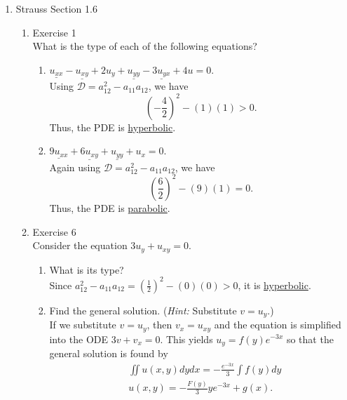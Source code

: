 \documentclass[12pt]{article}%
\begin{document}
\begin{enumerate}
    \pagebreak
    
    \item Strauss Section 1.6 \smallskip
    \begin{enumerate}
        \item Exercise 1 \smallskip \\
        What is the type of each of the following equations?
        \begin{enumerate}
            \item $\underline{u_{xx}} - \underline{u_{xy}} + 2u_y + \underline{u_{yy}} - \underline{3u_{yx}} + 4u = 0$. \smallskip \\
            Using $\mathcal{D} = a_{12}^2 - a_{11}a_{12}$, we have
            $$\left(-\frac{4}{2}\right)^2 - \left(1\right)\left(1\right) > 0.$$
            Thus, the PDE is \underline{hyperbolic}. \\

            
            \item $\underline{9u_{xx}} + \underline{6u_{xy}} + \underline{u_{yy}} + u_x = 0$. \smallskip \\Again using $\mathcal{D} = a_{12}^2 - a_{11}a_{12}$, we have
            $$\left(\frac{6}{2}\right)^2 - \left(9\right)\left(1\right) = 0.$$
            Thus, the PDE is \underline{parabolic}. \\

            
        \end{enumerate}
        \item Exercise 6 \smallskip \\
        Consider the equation $3u_y + u_{xy} =0$.
        \begin{enumerate}
            \item What is its type? \smallskip \\
            Since $a_{12}^2 - a_{11}a_{12} = \left(\frac{1}{2}\right)^2 - \left(0\right)\left(0\right) > 0$, it is \underline{hyperbolic}.
            
            \item Find the general solution. (\emph{Hint:} Substitute $v = u_y$.) \smallskip \\
            If we substitute $v = u_y$, then $v_x = u_{xy}$ and the equation is simplified into the ODE $3v + v_x = 0$. This yields $u_y = f\left(y\right) e^{-3x}$ so that the general solution is found by
            \begin{align*}
                &\iint u\left(x,y\right) dydx = -\frac{e^{-3x}}{3} \int f\left(y\right) dy \\
                &\boxed{u\left(x,y\right) = -\frac{F\left(y\right)}{3}y e^{-3x} + g\left(x\right).} \\
            \end{align*}


\end{enumerate}
\end{enumerate}
\end{enumerate}
\end{document}
